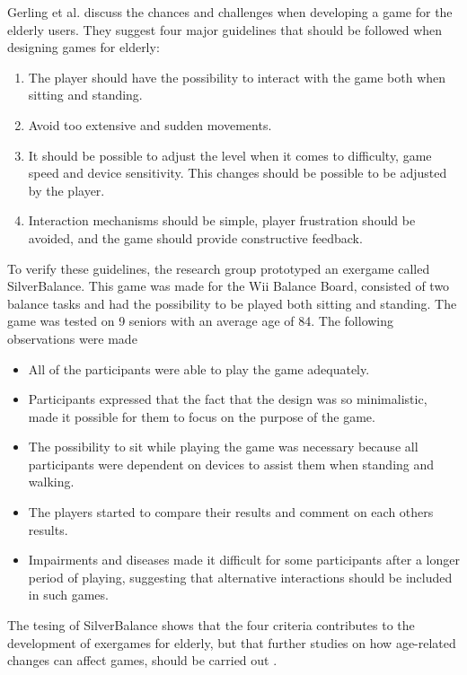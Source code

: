 Gerling et al. \cite{gerling1} discuss the chances and challenges when developing a game for the elderly users. They suggest four major guidelines that should be followed when designing games for elderly:
\begin{enumerate}
\item The player should have the possibility to interact with the game both when sitting and standing. 
\item Avoid too extensive and sudden movements.
\item It should be possible to adjust the level when it comes to difficulty, game speed and device sensitivity. This changes should be possible to be adjusted by the player. 
\item Interaction mechanisms should be simple, player frustration should be avoided, and the game should provide constructive feedback.
\end{enumerate}

To verify these guidelines, the research group prototyped an exergame called SilverBalance. This game was made for the Wii Balance Board, consisted of two balance tasks and had the possibility to be played both sitting and standing. The game was tested on 9 seniors with an average age of 84. The following observations were made \cite{gerling1}
\begin{itemize}
\item All of the participants were able to play the game adequately. 
\item Participants expressed that the fact that the design was so minimalistic, made it possible for them to focus on the purpose of the game. 
\item The possibility to sit while playing the game was necessary because all participants were dependent on devices to assist them when standing and walking.
\item The players started to compare their results and comment on each others results.
\item Impairments and diseases made it difficult for some participants after a longer period of playing, suggesting that alternative interactions should be included in such games.
\end{itemize}

The tesing of SilverBalance shows that the four criteria contributes to the development of exergames for elderly, but that further studies on how age-related changes can affect games, should be carried out \cite{gerling1}.

